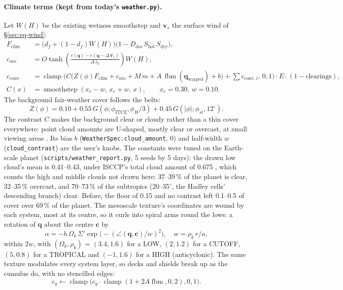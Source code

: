 \documentclass[11pt,a4paper]{article}
\begin{document}
\paragraph{Climate terms (kept from today's \texttt{weather.py}).} Let $W(H)$ be the existing
wetness smoothstep and $\mathbf{v}_s$ the surface wind of \S\ref{sec:eq-wind}:
\begin{align}
  F_{\mathrm{clim}}&=\big(d_f+(1-d_f)W(H)\big)\big(1-D_{\mathrm{des}}\,S_{\mathrm{hot}}\,S_{\mathrm{dry}}\big),\\
  c_{\mathrm{oro}}&=O\tanh\!\left(\frac{e(\mathbf{q})-e(\mathbf{q}-\Delta\,\hat{\mathbf{v}}_s)}
     {\Delta\,s_0}\right)W(H),\\
  c_{\mathrm{conv}}&=\operatorname{clamp}\Big(C\big(Z(\phi)F_{\mathrm{clim}}+c_{\mathrm{oro}}+M\,m
     +A\,\operatorname{fbm}(\mathbf{q}_{\mathrm{warped}})+b\big)+\textstyle\sum c_{\mathrm{conv},i},\,0,1\Big)
     \cdot E\cdot(1-\text{clearings}),\\
  C(x)&=\operatorname{smoothstep}(x_e-w,\,x_e+w,\,x),\qquad x_e=0.30,\ w=0.10.
\end{align}
The background fair-weather cover follows the belts:
\begin{equation}
  Z(\phi)=0.10+0.55\,G(\phi;\phi_{\mathrm{ITCZ}},\phi_H/3)+0.45\,G(|\phi|;\phi_{st},12^\circ).
\end{equation}
The contrast $C$ makes the background clear or cloudy rather than a thin cover everywhere:
point cloud amounts are U-shaped, mostly clear or overcast, at small viewing areas
\cite{usaf_cloudfree}. Its bias $b$ (\texttt{WeatherSpec.cloud\_amount}, 0) and half-width $w$
(\texttt{cloud\_contrast}) are the user's knobs. The constants were tuned on the Earth-scale
planet (\texttt{scripts/weather\_report.py}, 5 seeds by 5 days): the drawn low cloud's mean is
0.41--0.43, under ISCCP's total cloud amount of 0.675 \cite{rossow1999}, which counts the high
and middle clouds not drawn here; 37--39\,\% of the planet is clear, 32--35\,\% overcast, and
70--73\,\% of the subtropics (20--35$^\circ$, the Hadley cells' descending branch) clear. Before,
the floor of 0.15 and no contrast left 0.1--0.5 of cover over 69\,\% of the planet.
The mesoscale texture's coordinates are wound by each system, most at its centre, so it curls
into spiral arms round the lows: a rotation of $\mathbf{q}$ about the centre $\mathbf{c}$ by
\begin{equation}
  \alpha=-h\,\Omega_k\,\Sigma'\exp\!\big(-(\angle(\mathbf{q},\mathbf{c})/w)^2\big),\quad
  w=\rho_k\,r/a,
\end{equation}
within $2w$, with $(\Omega_k,\rho_k)$ = $(3.4,1.6)$ for a LOW, $(2,1.2)$ for a CUTOFF,
$(5,0.8)$ for a TROPICAL and $(-1,1.6)$ for a HIGH (anticyclonic). The same texture
modulates every system layer, so decks and shields break up as the cumulus do, with no
stencilled edges:
\begin{equation}
  c_g\leftarrow\operatorname{clamp}\big(c_g\cdot\operatorname{clamp}(1+2A\operatorname{fbm},0,2),0,1\big).
\end{equation}
\end{document}
